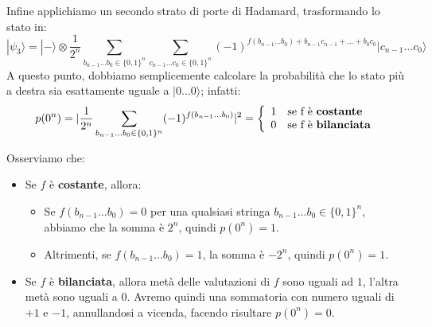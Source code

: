 Infine applichiamo un secondo strato di porte di Hadamard, trasformando lo stato in:
\begin{equation*}
   |\psi_3\rangle = |-\rangle \otimes \frac{1}{2^n} \sum_{b_{n-1}\hdots b_0 \in \{0,1\}^n} \sum_{c_{n-1}\hdots c_0 \in \{0,1\}^n} (-1)^{f(b_{n-1} \hdots b_0) + b_{n-1}c_{n-1} + \hdots + b_0c_0}|c_{n-1} \hdots c_0\rangle
\end{equation*}
A questo punto, dobbiamo semplicemente calcolare la probabilità che lo stato più a destra
sia esattamente uguale a $|0 \hdots 0\rangle$; infatti:
\begin{equation*}
    p(0^n) = \vert \frac{1}{2^n} \sum_{b_{n-1} \hdots b_0 \in \{0,1\}^n} (-1)^{f(b_{n-1} \hdots b_0)} \vert^2 =
    \left\{ \begin{array}{l l}
        1 & \text{se f è }\textbf{costante} \\
        0 & \text{se f è }\textbf{bilanciata}  
    \end{array}\right.
\end{equation*}
\begin{oss}{}{}
    Osserviamo che:
    \begin{itemize}
        \item Se $f$ è \textbf{costante}, allora:
            \begin{itemize}
                \item Se $f(b_{n-1} \hdots b_0) = 0$ per una qualsiasi stringa $b_{n-1} \hdots b_0 \in \{0,1\}^n$, abbiamo che la somma è $2^n$, quindi $p(0^n) = 1$.
                \item Altrimenti, se $f(b_{n-1} \hdots b_0) = 1$, la somma è $-2^n$, quindi $p(0^n) = 1$.
            \end{itemize}
        \item Se $f$ è \textbf{bilanciata}, allora metà delle valutazioni di $f$ sono uguali ad $1$, l'altra metà sono uguali a $0$. Avremo quindi una sommatoria con numero uguali di $+1$ e $-1$, annullandosi a vicenda, facendo risultare $p(0^n) = 0$.
    \end{itemize}
\end{oss}